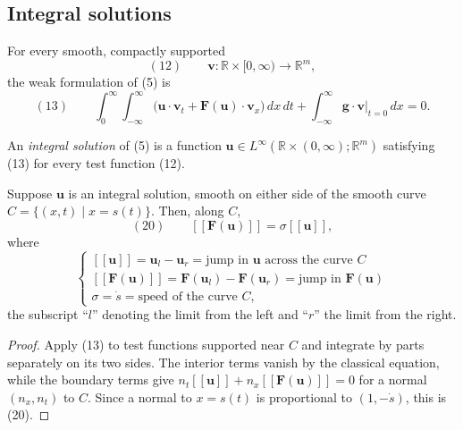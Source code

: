 \subsection{Integral solutions}\label{sec:integral-solutions-systems}

For every smooth, compactly supported
\[
(12)\qquad \mathbf v:\mathbb R\times[0,\infty)\to\mathbb R^m,
\]
the weak formulation of (5) is
\[
(13)\qquad
\int_0^\infty\!\int_{-\infty}^{\infty}
\bigl(\mathbf u\cdot\mathbf v_t+\mathbf F(\mathbf u)\cdot\mathbf v_x\bigr)\,dx\,dt
+\int_{-\infty}^{\infty}\mathbf g\cdot\mathbf v\big|_{t=0}\,dx=0.
\]

\begin{definition}
\label{def:integral-solution-system}
An \textit{integral solution} of (5) is a function
$\mathbf u\in L^\infty(\mathbb R\times(0,\infty);\mathbb R^m)$ satisfying (13) for every test function (12).
\end{definition}

\begin{proposition}
\label{prop:rankine-hugoniot-condition-system}
Suppose $\mathbf u$ is an integral solution, smooth on either side of the smooth curve
$C=\{(x,t)\mid x=s(t)\}$. Then, along $C$,
$$(20) \qquad [\![\mathbf{F}(\mathbf{u})]\!] = \sigma[\![\mathbf{u}]\!],$$
where
$$\begin{cases}
[\![\mathbf{u}]\!] = \mathbf{u}_l - \mathbf{u}_r = \text{jump in } \mathbf{u} \text{ across the curve } C \\
[\![\mathbf{F}(\mathbf{u})]\!] = \mathbf{F}(\mathbf{u}_l) - \mathbf{F}(\mathbf{u}_r) = \text{jump in } \mathbf{F}(\mathbf{u}) \\
\sigma = \dot{s} = \text{speed of the curve } C,
\end{cases}$$
the subscript ``$l$'' denoting the limit from the left and ``$r$'' the limit from the right.
\end{proposition}

\begin{proof}
\sketch Apply (13) to test functions supported near $C$ and integrate by parts separately on its two sides. The interior terms vanish by the classical equation, while the boundary terms give
$n_t[\![\mathbf u]\!]+n_x[\![\mathbf F(\mathbf u)]\!]=0$ for a normal $(n_x,n_t)$ to $C$. Since a normal to $x=s(t)$ is proportional to $(1,-\dot s)$, this is (20).
\end{proof}

